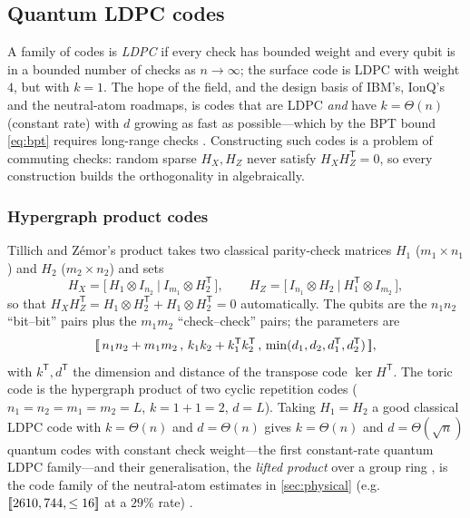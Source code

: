 \subsection{Quantum LDPC codes}\label{sec:qldpc}

A family of codes is \emph{LDPC} if every check has bounded weight and every qubit is in a bounded number of checks as $n\to\infty$; the surface code is LDPC with weight $4$, but with $k=1$. The hope of the field, and the design basis of IBM's, IonQ's and the neutral-atom roadmaps, is codes that are LDPC \emph{and} have $k=\Theta(n)$ (constant rate) with $d$ growing as fast as possible---which by the BPT bound \eqref{eq:bpt} requires long-range checks \cite{breuckmann-eberhardt21}. Constructing such codes is a problem of commuting checks: random sparse $H_X,H_Z$ never satisfy $H_XH_Z^{\mathsf T}=0$, so every construction builds the orthogonality in algebraically.

\subsubsection{Hypergraph product codes}
Tillich and Z\'emor's product \cite{tillich-zemor14} takes two classical parity-check matrices $H_1$ ($m_1\times n_1$) and $H_2$ ($m_2\times n_2$) and sets
\begin{equation}\label{eq:hgp}
H_X=\big[\,H_1\otimes I_{n_2}\ \big|\ I_{m_1}\otimes H_2^{\mathsf T}\,\big],\qquad
H_Z=\big[\,I_{n_1}\otimes H_2\ \big|\ H_1^{\mathsf T}\otimes I_{m_2}\,\big],
\end{equation}
so that $H_XH_Z^{\mathsf T}=H_1\otimes H_2^{\mathsf T}+H_1\otimes H_2^{\mathsf T}=0$ automatically. The qubits are the $n_1n_2$ ``bit--bit'' pairs plus the $m_1m_2$ ``check--check'' pairs; the parameters are
\[
[\![\,n_1n_2+m_1m_2\,,\,k_1k_2+k_1^{\mathsf T}k_2^{\mathsf T}\,,\,\min(d_1,d_2,d_1^{\mathsf T},d_2^{\mathsf T})\,]\!],
\]
with $k^{\mathsf T},d^{\mathsf T}$ the dimension and distance of the transpose code $\ker H^{\mathsf T}$. The toric code is the hypergraph product of two cyclic repetition codes ($n_1=n_2=m_1=m_2=L$, $k=1+1=2$, $d=L$). Taking $H_1=H_2$ a good classical LDPC code with $k=\Theta(n)$ and $d=\Theta(n)$ gives $k=\Theta(n)$ and $d=\Theta(\sqrt n)$ quantum codes with constant check weight---the first constant-rate quantum LDPC family---and their generalisation, the \emph{lifted product} over a group ring \cite{panteleev-kalachev21bposd}, is the code family of the neutral-atom estimates in \cref{sec:physical} (e.g.\ $[\![2610,744,\le16]\!]$ at a $29\%$ rate) \cite{cain26}.

